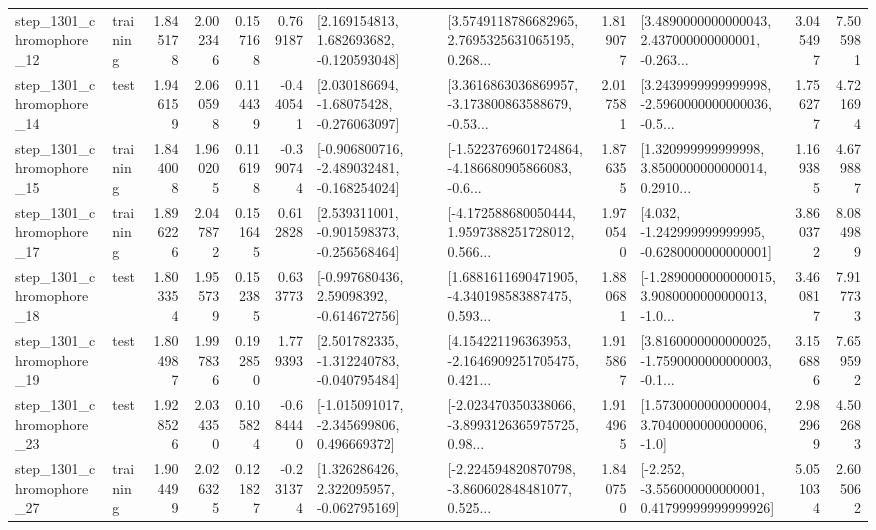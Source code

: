 \begin{tabular}{llrrrrllrlrr}
 step\_1301\_chromophore\_12 &  training &      1.845178 &    2.002346 &      0.157168 &  0.769187 &    [2.169154813, 1.682693682, -0.120593048] &  [3.5749118786682965, 2.7695325631065195, 0.268... &       1.819077 &  [3.4890000000000043, 2.437000000000001, -0.263... &            3.045497 &          7.505981 \\
 step\_1301\_chromophore\_14 &      test &      1.946159 &    2.060598 &      0.114439 & -0.440541 &    [2.030186694, -1.68075428, -0.276063097] &  [3.3616863036869957, -3.173800863588679, -0.53... &       2.017581 &  [3.2439999999999998, -2.5960000000000036, -0.5... &            1.756277 &          4.721694 \\
 step\_1301\_chromophore\_15 &  training &      1.844008 &    1.960205 &      0.116198 & -0.390744 &  [-0.906800716, -2.489032481, -0.168254024] &  [-1.5223769601724864, -4.186680905866083, -0.6... &       1.876355 &  [1.320999999999998, 3.8500000000000014, 0.2910... &            1.169385 &          4.679887 \\
 step\_1301\_chromophore\_17 &  training &      1.896226 &    2.047872 &      0.151645 &  0.612828 &   [2.539311001, -0.901598373, -0.256568464] &  [-4.172588680050444, 1.9597388251728012, 0.566... &       1.970540 &   [4.032, -1.242999999999995, -0.6280000000000001] &            3.860372 &          8.084989 \\
 step\_1301\_chromophore\_18 &      test &      1.803354 &    1.955739 &      0.152385 &  0.633773 &    [-0.997680436, 2.59098392, -0.614672756] &  [1.6881611690471905, -4.340198583887475, 0.593... &       1.880681 &  [-1.2890000000000015, 3.9080000000000013, -1.0... &            3.460817 &          7.917733 \\
 step\_1301\_chromophore\_19 &      test &      1.804987 &    1.997836 &      0.192850 &  1.779393 &   [2.501782335, -1.312240783, -0.040795484] &  [4.154221196363953, -2.1646909251705475, 0.421... &       1.915867 &  [3.8160000000000025, -1.7590000000000003, -0.1... &            3.156886 &          7.659592 \\
 step\_1301\_chromophore\_23 &      test &      1.928526 &    2.034350 &      0.105824 & -0.684440 &   [-1.015091017, -2.345699806, 0.496669372] &  [-2.023470350338066, -3.8993126365975725, 0.98... &       1.914965 &     [1.5730000000000004, 3.7040000000000006, -1.0] &            2.982969 &          4.502683 \\
 step\_1301\_chromophore\_27 &  training &      1.904499 &    2.026325 &      0.121827 & -0.231374 &    [1.326286426, 2.322095957, -0.062795169] &  [-2.224594820870798, -3.860602848481077, 0.525... &       1.840750 &  [-2.252, -3.556000000000001, 0.41799999999999926] &            5.051034 &          2.605062 \\

\end{tabular}
